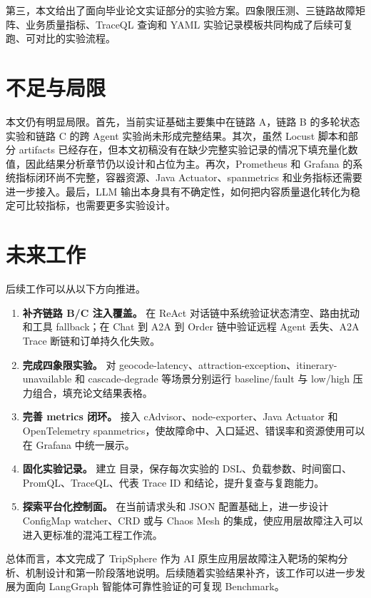 第三，本文给出了面向毕业论文实证部分的实验方案。四象限压测、三链路故障矩阵、业务质量指标、TraceQL 查询和 YAML 实验记录模板共同构成了后续可复跑、可对比的实验流程。

\section{不足与局限}

本文仍有明显局限。首先，当前实证基础主要集中在链路 A，链路 B 的多轮状态实验和链路 C 的跨 Agent 实验尚未形成完整结果。其次，虽然 Locust 脚本和部分 artifacts 已经存在，但本文初稿没有在缺少完整实验记录的情况下填充量化数值，因此结果分析章节仍以设计和占位为主。再次，Prometheus 和 Grafana 的系统指标闭环尚不完整，容器资源、Java Actuator、spanmetrics 和业务指标还需要进一步接入。最后，LLM 输出本身具有不确定性，如何把内容质量退化转化为稳定可比较指标，也需要更多实验设计。

\section{未来工作}

后续工作可以从以下方向推进。

\begin{enumerate}[label=(\arabic*)]
  \item \textbf{补齐链路 B/C 注入覆盖。} 在 ReAct 对话链中系统验证状态清空、路由扰动和工具 fallback；在 Chat 到 A2A 到 Order 链中验证远程 Agent 丢失、A2A Trace 断链和订单持久化失败。
  \item \textbf{完成四象限实验。} 对 geocode-latency、attraction-exception、itinerary-unavailable 和 cascade-degrade 等场景分别运行 baseline/fault 与 low/high 压力组合，填充论文结果表格。
  \item \textbf{完善 metrics 闭环。} 接入 cAdvisor、node-exporter、Java Actuator 和 OpenTelemetry spanmetrics，使故障命中、入口延迟、错误率和资源使用可以在 Grafana 中统一展示。
  \item \textbf{固化实验记录。} 建立  目录，保存每次实验的 DSL、负载参数、时间窗口、PromQL、TraceQL、代表 Trace ID 和结论，提升复查与复跑能力。
  \item \textbf{探索平台化控制面。} 在当前请求头和 JSON 配置基础上，进一步设计 ConfigMap watcher、CRD 或与 Chaos Mesh 的集成，使应用层故障注入可以进入更标准的混沌工程工作流。
\end{enumerate}

总体而言，本文完成了 TripSphere 作为 AI 原生应用层故障注入靶场的架构分析、机制设计和第一阶段落地说明。后续随着实验结果补齐，该工作可以进一步发展为面向 LangGraph 智能体可靠性验证的可复现 Benchmark。
